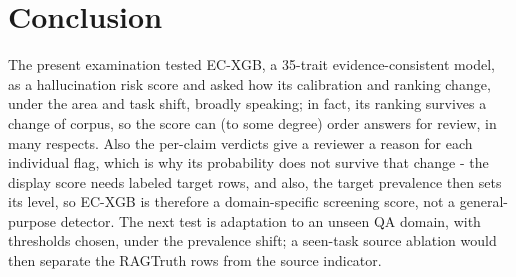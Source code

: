 \documentclass[a4paper,fleqn]{cas-sc}
\begin{document}
\section{Conclusion}\label{sec:conclusion}

The present examination tested EC-XGB, a 35-trait evidence-consistent model, as a hallucination risk score and asked how its calibration and ranking change, under the area and task shift, broadly speaking; in fact, its ranking survives a change of corpus, so the score can (to some degree) order answers for review, in many respects. Also the per-claim verdicts give a reviewer a reason for each individual flag, which is why its probability does not survive that change - the display score needs labeled target rows, and also, the target prevalence then sets its level, so EC-XGB is therefore a domain-specific screening score, not a general-purpose detector. The next test is adaptation to an unseen QA domain, with thresholds chosen, under the prevalence shift; a seen-task source ablation would then separate the RAGTruth rows from the source indicator.

\printcredits
\end{document}
